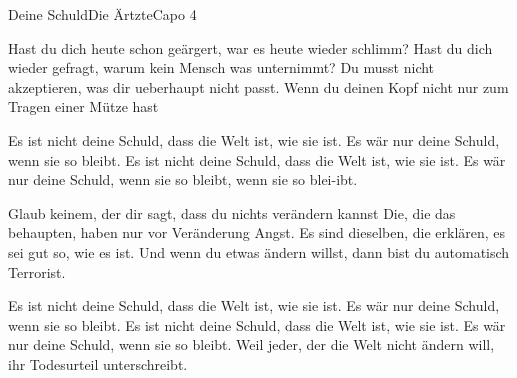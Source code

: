 \begin{song}{Deine Schuld}{Die Ärtzte}{Capo 4}


Hast du dich heute schon geärgert, war es heute wieder schlimm?
Hast du dich wieder gefragt, warum kein Mensch was unternimmt?
Du musst nicht akzeptieren, was dir ueberhaupt nicht passt.
Wenn du deinen Kopf nicht nur zum Tragen einer Mütze hast 

Es ist nicht deine Schuld, dass die Welt ist, wie sie ist.
Es wär nur deine Schuld, wenn sie so bleibt.
Es ist nicht deine Schuld, dass die Welt ist, wie sie ist.
Es wär nur deine Schuld, wenn sie so bleibt, wenn sie so blei-ibt.


Glaub keinem, der dir sagt, dass du nichts verändern kannst
Die, die das behaupten, haben nur vor Veränderung Angst.
Es sind dieselben, die erklären, es sei gut so, wie es ist.
Und wenn du etwas ändern willst, dann bist du automatisch Terrorist.

Es ist nicht deine Schuld, dass die Welt ist, wie sie ist.
Es wär nur deine Schuld, wenn sie so bleibt.
Es ist nicht deine Schuld, dass die Welt ist, wie sie ist.
Es wär nur deine Schuld, wenn sie so bleibt.
Weil jeder, der die Welt nicht ändern will, ihr Todesurteil unterschreibt.


\end{song}
